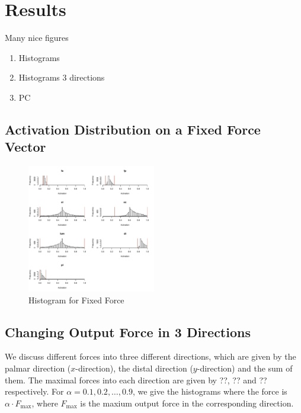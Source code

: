 \section{Results}
Many nice figures
\begin{enumerate}
	\item Histograms
	\item Histograms 3 directions
	\item PC
\end{enumerate}

\subsection{Activation Distribution on a  Fixed Force Vector}

\begin{figure}[ht]
   \begin{center}
    \includegraphics[width=0.5\textwidth]{figs/raw_histograms.pdf}
  \end{center}
  \caption{Histogram for Fixed Force}
  \label{fig_rawhisto}
\end{figure}


\subsection{Changing Output Force in 3 Directions}
We discuss different forces into three different directions, which are given by the palmar direction ($x$-direction), the distal direction ($y$-direction) and the sum of them. The maximal forces into each direction are given by ??, ?? and ?? respectively. For $\alpha = 0.1, 0.2, \dots, 0.9$, we give the histograms where the force is $\alpha \cdot F_{\max}$, where $F_{\max}$ is the maxium output force in the corresponding direction. 

